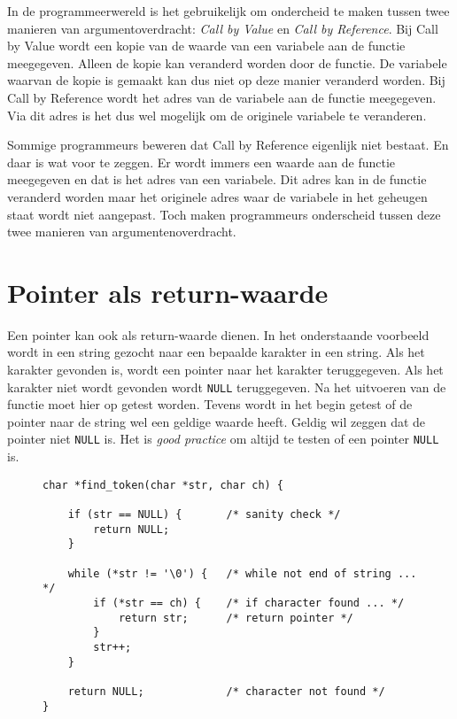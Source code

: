 \begin{infobox}
In de programmeerwereld is het gebruikelijk om ondercheid te maken tussen twee manieren van argumentoverdracht: \textsl{Call by Value} en \textsl{Call by Reference}. Bij Call by Value wordt een kopie van de waarde van een variabele aan de functie meegegeven. Alleen de kopie kan veranderd worden door de functie. De variabele waarvan de kopie is gemaakt kan dus niet op deze manier veranderd worden. Bij Call by Reference wordt het adres van de variabele aan de functie meegegeven. Via dit adres is het dus wel mogelijk om de originele variabele te veranderen.

Sommige programmeurs beweren dat Call by Reference eigenlijk niet bestaat. En daar is wat voor te zeggen. Er wordt immers een waarde aan de functie meegegeven en dat is het adres van een variabele. Dit adres kan in de functie veranderd worden maar het originele adres waar de variabele in het geheugen staat wordt niet aangepast. Toch maken programmeurs onderscheid tussen deze twee manieren van argumentenoverdracht.
\end{infobox}

\section{Pointer als return-waarde}
\label{sec:pointersalsreturnwaarde}
Een pointer kan ook als return-waarde dienen. In het onderstaande voorbeeld wordt in een string gezocht naar een bepaalde karakter in een string. Als het karakter gevonden is, wordt een pointer naar het karakter teruggegeven. Als het karakter niet wordt gevonden wordt \texttt{NULL} teruggegeven. Na het uitvoeren van de functie moet hier op getest worden. Tevens wordt in het begin getest of de pointer naar de string wel een geldige waarde heeft. Geldig wil zeggen dat de pointer niet \texttt{NULL} is. Het is \textsl{good practice} om altijd te testen of een pointer \texttt{NULL} is.

\begin{figure}[!ht]
\begin{lstlisting}[caption=Pointer als return-waarde.]
char *find_token(char *str, char ch) {

    if (str == NULL) {       /* sanity check */
        return NULL;
    }

    while (*str != '\0') {   /* while not end of string ... */
        if (*str == ch) {    /* if character found ... */
            return str;      /* return pointer */
        }
        str++;
    }

    return NULL;             /* character not found */
}
\end{lstlisting}
\end{figure}

